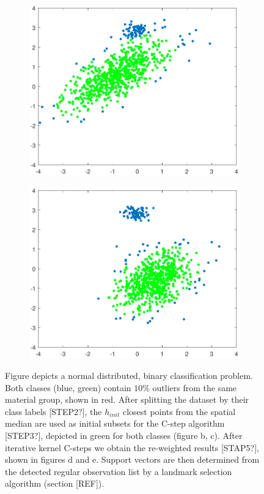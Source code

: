 \documentclass[preprint,12pt]{elsarticle}
\begin{document}
\begin{figure}[!htb]
	\begin{subfigure}[b]{0.40\linewidth}
		\centering\includegraphics[width=1\linewidth]{figures/kcstep/c1output.pdf}
		\caption{\label{fig:kcstepc1}}
	\end{subfigure}
	\begin{subfigure}[b]{0.40\linewidth}
		\centering\includegraphics[width=1\linewidth]{figures/kcstep/c2output.pdf}
		\caption{\label{fig:kcstepc2}}
	\end{subfigure}

	\caption{
		Figure  depicts a normal distributed, binary classification problem. Both classes (blue, green) contain $10\%$ outliers from the same material group, shown in red. After splitting the dataset by their class labels [STEP2?], the $h_ {init} $ closest points from the spatial median are used as initial subsets for the C-step algorithm [STEP3?], depicted in green for both classes (figure b, c). After iterative kernel C-steps we obtain the re-weighted results  [STAP5?], shown in figures d and e. Support vectors are then determined from the detected regular observation list by a landmark selection algorithm (section [REF]).}
\end{figure}
 
\end{document}
